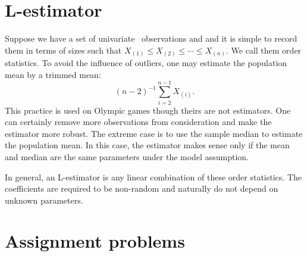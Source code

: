 \section{L-estimator}
Suppose we have a set of univariate \iid\ observations and
and it is simple to record them in terms of sizes such that
$X_{(1)} \leq X_{(2)} \leq \cdots \leq X_{(n)}$. We call them
order statistics. To avoid the influence of outliers, one may
estimate the population mean by a trimmed mean:
\[
(n-2)^{-1} \sum_{i=2}^{n-1} X_{(i)}.
\]
This practice is used on Olympic games though theirs
are not estimators. One can certainly remove more observations
from consideration and make the estimator more robust.
The extreme case is to use the sample median to
estimate the population mean. In this case, the estimator
makes sense only if the mean and median are the
same parameters under the model assumption.

In general, an L-estimator is any linear combination of
these order statistics. The coefficients are required to
be non-random and naturally do not depend on unknown parameters.

\section{Assignment problems}

